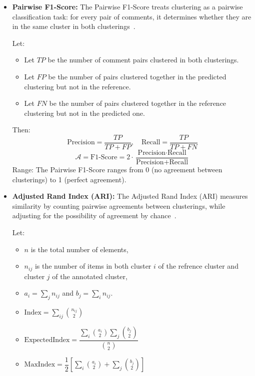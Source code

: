 \documentclass[manuscript,review, anonymous]{acmart}
\begin{document}
\begin{itemize}
    \item \textbf{Pairwise F1-Score:}
    The Pairwise F1-Score treats clustering as a pairwise classification task: for every pair of comments, it determines whether they are in the same cluster in both clusterings~\cite{f1_pairwise}.

    Let:
    \begin{itemize}
        \item Let $TP$ be the number of comment pairs clustered in both clusterings.
        \item Let $FP$ be the number of pairs clustered together in the predicted clustering but not in the reference.
        \item Let $FN$ be the number of pairs clustered together in the reference clustering but not in the predicted one.
    \end{itemize}
    
    Then:
    \[
    \text{Precision} = \frac{TP}{TP + FP}, \quad \text{Recall} = \frac{TP}{TP + FN}
    \]
    \[
    \mathcal{A} = \text{F1-Score} = 2 \cdot \frac{\text{Precision} \cdot \text{Recall}}{\text{Precision} + \text{Recall}}
    \]
    Range: The Pairwise F1-Score ranges from 0 (no agreement between clusterings) to 1 (perfect agreement).



    \item \textbf{Adjusted Rand Index (ARI):}
    The Adjusted Rand Index (ARI) measures similarity by counting pairwise agreements between clusterings, while adjusting for the possibility of agreement by chance~\cite{ari_original}.

    Let:
    \begin{itemize}
        \item $n$ is the total number of elements,
        \item $n_{ij}$ is the number of items in both cluster $i$ of the refrence cluster and cluster $j$ of the annotated cluster,
        \item $a_i = \sum_j n_{ij}$ and $b_j = \sum_i n_{ij}$.
         \item $\text{Index} = \sum_{ij} \binom{n_{ij}}{2}$
         \item $\text{ExpectedIndex} = \dfrac{\sum_i \binom{a_i}{2} \sum_j \binom{b_j}{2}}{\binom{n}{2}}$
         \item $\text{MaxIndex} = \dfrac{1}{2} \left[\sum_i \binom{a_i}{2} + \sum_j \binom{b_j}{2} \right]$
    \end{itemize}


\end{itemize}
\end{document}

